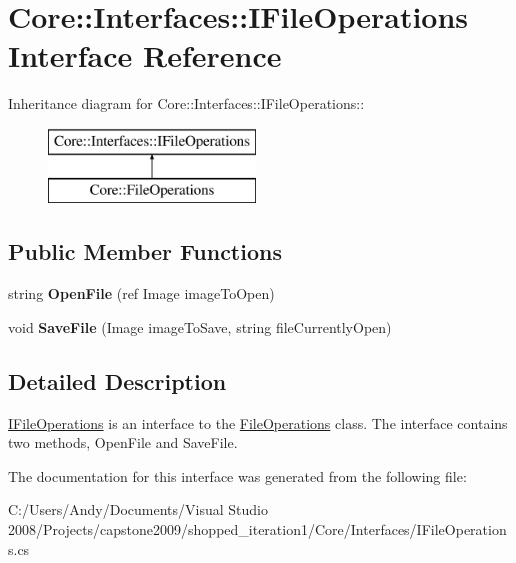 \hypertarget{interface_core_1_1_interfaces_1_1_i_file_operations}{
\section{Core::Interfaces::IFileOperations Interface Reference}
\label{interface_core_1_1_interfaces_1_1_i_file_operations}
}
Inheritance diagram for Core::Interfaces::IFileOperations::\begin{figure}[H]
\begin{center}
\leavevmode
\includegraphics[height=2cm]{interface_core_1_1_interfaces_1_1_i_file_operations}
\end{center}
\end{figure}
\subsection*{Public Member Functions}
\begin{DoxyCompactItemize}
\item 
\hypertarget{interface_core_1_1_interfaces_1_1_i_file_operations_a4a164cfcc6245570b0abf91b92d4b8c4}{
string {\bfseries OpenFile} (ref Image imageToOpen)}
\label{interface_core_1_1_interfaces_1_1_i_file_operations_a4a164cfcc6245570b0abf91b92d4b8c4}

\item 
\hypertarget{interface_core_1_1_interfaces_1_1_i_file_operations_a4cab26fd0fb204748ef7b3bc0f0f9d00}{
void {\bfseries SaveFile} (Image imageToSave, string fileCurrentlyOpen)}
\label{interface_core_1_1_interfaces_1_1_i_file_operations_a4cab26fd0fb204748ef7b3bc0f0f9d00}

\end{DoxyCompactItemize}


\subsection{Detailed Description}
\hyperlink{interface_core_1_1_interfaces_1_1_i_file_operations}{IFileOperations} is an interface to the \hyperlink{class_core_1_1_file_operations}{FileOperations} class. The interface contains two methods, OpenFile and SaveFile. 

The documentation for this interface was generated from the following file:\begin{DoxyCompactItemize}
\item 
C:/Users/Andy/Documents/Visual Studio 2008/Projects/capstone2009/shopped\_\-iteration1/Core/Interfaces/IFileOperations.cs\end{DoxyCompactItemize}
